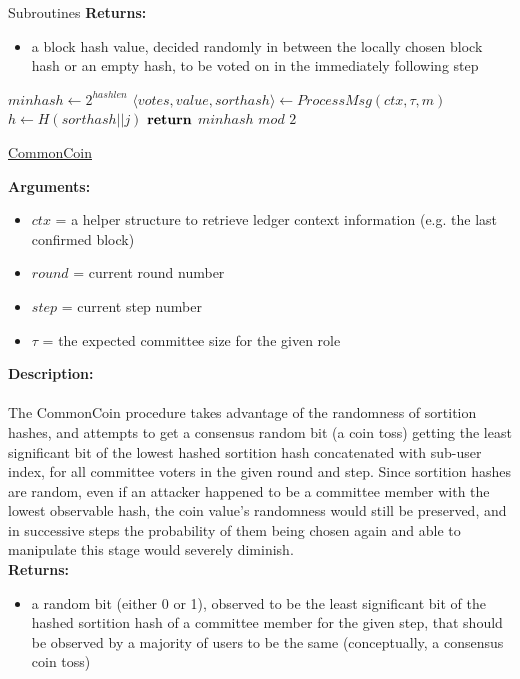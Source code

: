 \documentclass[10pt,a4paper]{article}
\begin{document}
\begin{section}{Subroutines}
\noindent \textbf{Returns:}
\begin{itemize}
    \item a block hash value, decided randomly in between the locally chosen block hash or an empty hash, to be voted on
    in the immediately following step
  \end{itemize}


\begin{algorithm}[H]
    \begin{algorithmic}[H]

    \State $minhash \gets 2^{hashlen}$
        \State $\langle votes,value,sorthash\rangle \gets ProcessMsg(ctx,\tau,m)$
                \State $h \gets H(sorthash||j)$
        \EndFor
    \EndFor
    $\Return$ $minhash$ $mod$ $2$
    \EndFunction
    \end{algorithmic}
    \caption{\underline{CommonCoin}}
\end{algorithm}


\noindent \textbf{Arguments:}
\begin{itemize}
    \item $ctx$ = a helper structure to retrieve ledger context information (e.g. the last confirmed block)
    \item $round$ = current round number
    \item $step$ = current step number
    \item $\tau$ = the expected committee size for the given role
  \end{itemize}

\noindent \textbf{Description:}\\\\
The CommonCoin procedure takes advantage of the randomness of sortition hashes, and attempts to
get a consensus random bit (a coin toss) getting the least significant bit of the lowest hashed
sortition hash concatenated with sub-user index, for all committee voters in the given round and step.
Since sortition hashes are random, even if an attacker happened to be a committee member with the lowest observable hash,
the coin value's randomness would still be preserved, and in successive steps the probability of them being chosen again and
able to manipulate this stage would severely diminish.\\

\noindent \textbf{Returns:}
\begin{itemize}
    \item a random bit (either 0 or 1), observed to be the least significant bit of the hashed sortition hash of a committee member for the given step,
    that should be observed by a majority of users to be the same (conceptually, a consensus coin toss)
  \end{itemize}

\end{section}




\end{document}
